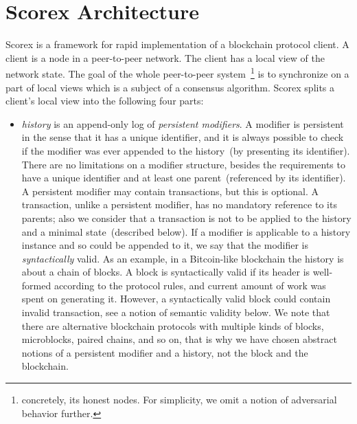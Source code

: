 
\section{Scorex Architecture}
\label{sec:scorex}

Scorex is a framework for rapid implementation of a blockchain protocol client. A client is a node in a peer-to-peer network. The client has a local view of the network state. The goal of the whole peer-to-peer system~\footnote{concretely, its honest nodes. For simplicity, we omit a notion of adversarial behavior further.} is to synchronize on a part of local views which is a subject of a consensus algorithm. Scorex splits a client's local view into the following four parts: 

\begin{itemize}
\item{\em history} is an append-only log of {\em persistent modifiers}. A modifier is persistent in the sense that it has a unique identifier, and it is always possible to check if the modifier was ever appended to the history~(by presenting its identifier). There are no limitations on a modifier structure, besides the requirements to have a unique identifier and at least one parent~(referenced by its identifier). A persistent modifier may contain transactions, but this is optional. A transaction, unlike a persistent modifier, has no mandatory reference to its parents; also we consider that a transaction is not to be applied to the history and a minimal state~(described below). If a modifier is applicable to a history instance and so could be appended to it, we say that the modifier is {\em syntactically} valid. As an example, in a Bitcoin-like blockchain the history is about a chain of blocks. A block is syntactically valid if its header is well-formed according to the protocol rules, and current amount of work was spent on generating it. However, a syntactically valid block could contain invalid transaction, see a notion of semantic validity below. We note that there are alternative blockchain protocols with multiple kinds of blocks, microblocks, paired chains, and so on, that is why we have chosen abstract notions of a persistent modifier and a history, not the block and the blockchain.   


\end{itemize}
